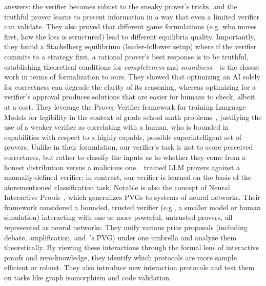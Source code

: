 answers: the verifier becomes robust to the sneaky prover’s tricks, and the truthful prover learns to present information in a way that even a limited verifier can validate. They also proved that different game formulations (e.g. who moves first, how the loss is structured) lead to different equilibria quality. Importantly, they found a Stackelberg equilibrium (leader-follower setup) where if the verifier commits to a strategy first, a rational prover’s best response is to be truthful, establishing theoretical conditions for \emph{completeness} and \emph{soundness}.~\citet{kirchner2024prover} is the closest work in terms of formalization to ours. They showed
that optimizing an AI solely for correctness can degrade the clarity of its reasoning, whereas optimizing for a verifier’s approval produces solutions that are easier for humans to check, albeit at a cost. They leverage the Prover-Verifier framework for training Language Models for legibility in the context of grade school math problems~\citep{cobbe2021training}, justifying the use of a weaker verifier as correlating with a human, who is bounded in capabilities with respect to a highly capable, possible superintelligent set of provers. Unlike in their formulation, our verifier’s task is not to score perceived correctness, but rather to classify the inputs as to whether they come from a honest distribution versus a malicious one.~\citet{amit2024models} trained LLM provers against a manually-defined verifier; in contrast, our verifier is learned on the basis of the aforementioned classification task. Notable is also the concept of Neural Interactive Proofs~\citep{hammond2024neural}, which generalizes PVGs to systems of neural networks. Their framework considered a bounded, trusted verifier (e.g., a smaller model or human simulation) interacting with one or more powerful, untrusted provers, all represented as neural networks. They unify various prior proposals (including debate, amplification, and~\citet{anil2021learning}'s PVG) under one umbrella and analyze them theoretically. By viewing these interactions through the formal lens of interactive proofs and zero-knowledge, they identify which protocols are more sample efficient or robust. They also introduce new interaction protocols and test them on tasks like graph isomorphism and code validation.

